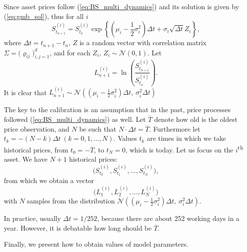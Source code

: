 \documentclass[a4paper,11pt, twoside]{book}
\theoremstyle{definition}
\theoremstyle{remark}
\begin{document}
Since asset prices follow (\ref{eq:BS_multi_dynamics}) and its solution is given by (\ref{eq:gmb_sol}), thus for all $i$
\[  S^{(i)}_{t_{n+1}} = S^{(i)}_{t_n} \exp\left\{ (\mu_i - \frac{1}{2}\sigma_i^2)\Delta t + \sigma_i \sqrt{\Delta t} Z_i \right\}, \]
where $\Delta t = t_{n+1} - t_n$, $Z$ is a random vector with correlation matrix $\Sigma = \bigl( \varrho_{ij} \bigr)_{i,j=1}^d$, and for each $Z_i$, $Z_i \sim \mathcal{N}(0,1)$. Let
\[  L^{(i)}_{n+1} = \ln\left( \frac{S^{(i)}_{t_{n+1}}}{S^{(i)}_{t_n}} \right). \]
It is clear that $ L^{(i)}_{n+1} \sim \mathcal{N}\left(  (\mu_i - \frac{1}{2}\sigma_i^2)\Delta t,\ \sigma_i^2 \Delta t \right)$

The key to the calibration is an assumption that in the past, price processes followed (\ref{eq:BS_multi_dynamics}) as well. Let $\overline{T}$ denote how old is the oldest price observation, and $N$ be such that $N \cdot \Delta t = \overline{T}$. Furthermore let $t_k = -(N-k)\Delta t\ (k=0,1,\ldots,N)$. Values $t_k$ are times in which we take historical prices, from $t_0 = -\overline{T}$, to $t_N = 0$, which is today. Let us focus on the $i$\textsuperscript{th} asset. We have $N+1$ historical prices:
\[  \bigl( S^{(i)}_{t_0}, S^{(i)}_{t_1}, \ldots,S^{(i)}_{t_N} \bigr), \]
from which we obtain a vector
\[ \bigl( L^{(i)}_{1}, L^{(i)}_{2}, \ldots, L^{(i)}_{N} \bigr) \]
with $N$ samples from the distribution $\mathcal{N}\left(  (\mu_i - \frac{1}{2}\sigma_i^2)\Delta t,\ \sigma_i^2 \Delta t \right)$.

In practice, usually $\Delta t = 1/252$, because there are about 252 working days in a year. However, it is debatable how long should be $\overline{T}$. 

Finally, we present how to obtain values of model parameters.
\end{document}

